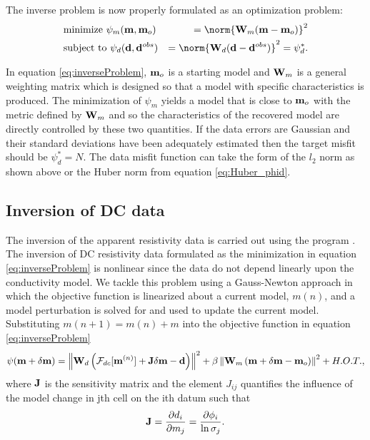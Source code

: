 The inverse problem is now properly formulated as an optimization problem: 
%
\begin{align}
\label{eq:inverseProblem}
& \mbox{minimize } \psi_m(\bvec{m},\bvec{m}_o)&=\norm{\mathbf{W}_m(\bvec{m}-\bvec{m}_o)}^2 \\ \nonumber
& \mbox{subject to } \psi_d(\bvec{d},\bvec{d}^{obs})&=\norm{\mathbf{W}_d(\bvec{d}-\bvec{d}^{obs})}^2 =\psi_d^*.
\end{align}

In equation \ref{eq:inverseProblem}, $\mathbf{m}_o$ is a starting model and $\mathbf{W}_m$ is a general weighting matrix which is designed so that a model with specific characteristics is produced. The minimization of $\psi_m$ yields a model that is close to $\mathbf{m}_o$ with the metric defined by $\mathbf{W}_m$ and so the characteristics of the recovered model are directly controlled by these two quantities. If the data errors are Gaussian and their standard deviations have been adequately estimated then the target misfit should be $\psi_d^* = N$. The data misfit function can take the form of the $l_2$ norm as shown above or the Huber norm from equation \ref{eq:Huber_phid}.

\subsection{Inversion of DC data}
The inversion of the apparent resistivity data is carried out using the program . The inversion of DC resistivity data formulated as the minimization in equation \ref{eq:inverseProblem} is nonlinear since the data do not depend linearly upon the conductivity model. We tackle this problem using a Gauss-Newton approach in which the objective function is linearized about a current model, $m(n)$, and a model perturbation is solved for and used to update the current model. Substituting $m(n+1) = m(n)+m$ into the objective function in equation \ref{eq:inverseProblem}
%
\begin{equation}
\psi(\mathbf{m} + \delta \mathbf{m}) =  \left\| \mathbf{W}_d\left( \mathcal{F}_{dc}[\mathbf{m}^{(n)}] + \mathbf{J}\delta\mathbf{m} - \mathbf{d}\right)\right\|^2 + \beta \left\| \mathbf{W}_m\left(\mathbf{m} + \delta\mathbf{m} - \mathbf{m}_o\right) \right\|^2 + H.O.T.,
\end{equation}
where $\mathbf{J}$ is the sensitivity matrix and the element $J_{ij}$ quantifies the influence of the model change in jth cell on the ith datum such that
%
\begin{equation}
\mathbf{J} = \frac{\partial d_i}{\partial m_j} = \frac{\partial \phi_i}{\ln \sigma_j}.
\end{equation}

